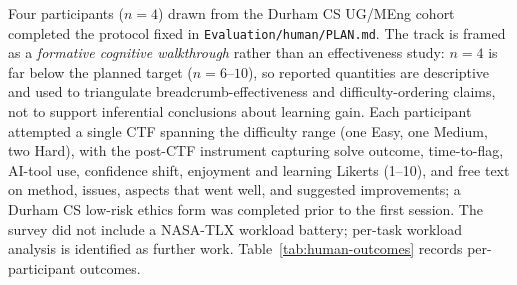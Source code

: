 Four participants ($n=4$) drawn from the Durham CS UG/MEng
cohort completed the protocol fixed in
\texttt{Evaluation/human/PLAN.md}. The track is framed as a
\emph{formative cognitive walkthrough} rather than an
effectiveness study: $n=4$ is far below the planned target
($n=6$--$10$), so reported quantities
are descriptive and used to triangulate breadcrumb-effectiveness
and difficulty-ordering claims, not to support inferential
conclusions about learning gain. Each participant attempted
a single CTF spanning the difficulty range (one Easy, one
Medium, two Hard), with the post-CTF instrument capturing
solve outcome, time-to-flag, AI-tool use, confidence shift,
enjoyment and learning Likerts (1--10), and free text on
method, issues, aspects that went well, and suggested
improvements; a Durham CS low-risk ethics form was completed
prior to the first session. The survey did not include a
NASA-TLX workload battery; per-task workload analysis is
identified as further work.
Table~\ref{tab:human-outcomes} records per-participant outcomes.

\begin{table}[t]
\centering
\caption{Human walkthrough outcomes. Participant identifies the
anonymised participant; CTF identifies the attempted challenge number;
Difficulty is the assigned challenge band; Outcome reports flags captured
out of total flags available in that challenge; Time is wall-clock time to
submission of the final flag attempted or to session end; Aided records
self-reported AI-tool use; Enjoyment and Learning are participant Likert
scores out of 10.}
\label{tab:human-outcomes}
\small
\setlength{\tabcolsep}{3pt}
\renewcommand{\arraystretch}{1.08}
\end{table}

